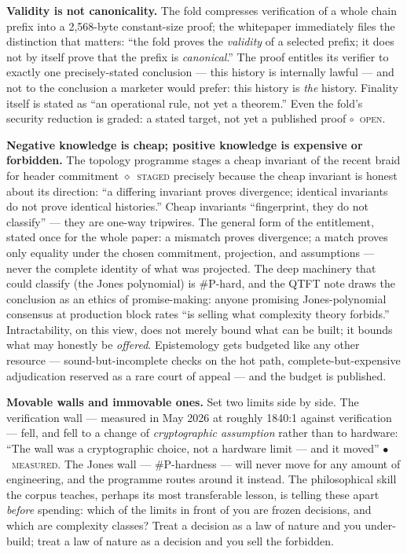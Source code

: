\documentclass[10pt,a4paper]{article}
\newcommand{\stM}{\textcolor{sigilcyan}{$\bullet$}~{\scriptsize\textcolor{sigilcyan}{\textsc{measured}}}}
\newcommand{\stG}{\textcolor{sigilviolet}{$\diamond$}~{\scriptsize\textcolor{sigilviolet}{\textsc{staged}}}}
\newcommand{\stO}{\textcolor{sigilamber}{$\circ$}~{\scriptsize\textcolor{sigilamber}{\textsc{open}}}}
\begin{document}
\textbf{Validity is not canonicality.} The fold compresses verification of a whole
chain prefix into a 2{,}568-byte constant-size proof; the whitepaper immediately
files the distinction that matters: ``the fold proves the \emph{validity} of a
selected prefix; it does not by itself prove that the prefix is \emph{canonical}.''
The proof entitles its verifier to exactly one precisely-stated conclusion — this
history is internally lawful — and not to the conclusion a marketer would prefer:
this history is \emph{the} history. Finality itself is stated as ``an operational
rule, not yet a theorem.'' Even the fold's security reduction is graded: a stated
target, not yet a published proof \stO.

\textbf{Negative knowledge is cheap; positive knowledge is expensive or
forbidden.} The topology programme stages a cheap invariant of the recent braid
for header commitment \stG{} precisely because the cheap invariant is honest about
its direction:
``a differing invariant proves divergence; identical invariants do not prove
identical histories.'' Cheap invariants ``fingerprint, they do not classify'' —
they are one-way tripwires. The general form of the entitlement, stated once for
the whole paper: a mismatch proves divergence; a match proves only equality under
the chosen commitment, projection, and assumptions — never the complete identity
of what was projected. The deep machinery that could classify (the Jones
polynomial) is \#P-hard, and the QTFT note draws the conclusion as an ethics of
promise-making: anyone promising Jones-polynomial consensus at production block
rates ``is selling what complexity theory forbids.'' Intractability, on this view,
does not merely bound what can be built; it bounds what may honestly be
\emph{offered}. Epistemology gets budgeted like any other resource —
sound-but-incomplete checks on the hot path, complete-but-expensive adjudication reserved as
a rare court of appeal — and the budget is published.

\textbf{Movable walls and immovable ones.} Set two limits side by side. The
verification wall — measured in May 2026 at roughly 1840:1 against verification —
fell, and fell to a change of \emph{cryptographic assumption} rather than to
hardware: ``The wall was a cryptographic choice, not a hardware limit — and it
moved'' \stM. The Jones wall — \#P-hardness — will never move for any amount of
engineering, and the programme routes around it instead. The philosophical skill
the corpus teaches, perhaps its most transferable lesson, is telling these apart
\emph{before} spending: which of the limits in front of you are frozen decisions,
and which are complexity classes? Treat a decision as a law of nature and you
under-build; treat a law of nature as a decision and you sell the forbidden.
\end{document}
